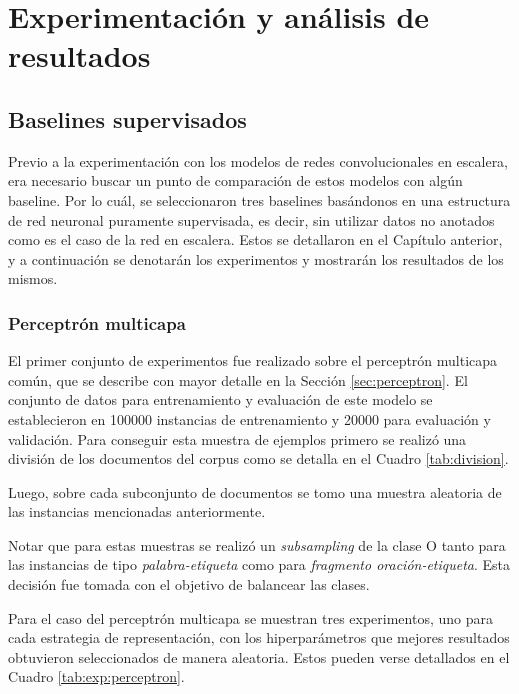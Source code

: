 \chapter{Experimentación y análisis de resultados} \label{chapter:chapter4}

\section{Baselines supervisados}

Previo a la experimentación con los modelos de redes convolucionales en escalera, era necesario buscar
un punto de comparación de estos modelos con algún baseline. Por lo cuál, se seleccionaron tres baselines
basándonos en una estructura de red neuronal puramente supervisada, es decir, sin utilizar datos no anotados como es el caso de la red en escalera. Estos se detallaron en el Capítulo anterior, y 
a continuación se denotarán los experimentos y mostrarán los resultados de los mismos.

\subsection{Perceptrón multicapa}\label{baseline:mlp}

El primer conjunto de experimentos fue realizado sobre el perceptrón multicapa común, que se describe con 
mayor detalle en la Sección \ref{sec:perceptron}. El conjunto de datos para entrenamiento y evaluación de este
modelo se establecieron en 100000 instancias de entrenamiento y 20000 para evaluación y validación. Para 
conseguir esta muestra de ejemplos primero se realizó una división de los documentos del corpus como se 
detalla en el Cuadro \ref{tab:division}. 

Luego, sobre cada subconjunto de documentos se tomo una muestra aleatoria de las instancias mencionadas 
anteriormente. 

Notar que para estas muestras se realizó un \textit{subsampling} de la clase O tanto para las instancias de
tipo \textit{palabra-etiqueta} como para \textit{fragmento oración-etiqueta}. Esta decisión fue tomada con el
objetivo de balancear las clases.

Para el caso del perceptrón multicapa se muestran tres experimentos, uno para cada estrategia de 
representación, con los hiperparámetros que mejores resultados obtuvieron seleccionados de manera aleatoria.
Estos pueden verse detallados en el Cuadro \ref{tab:exp:perceptron}.


